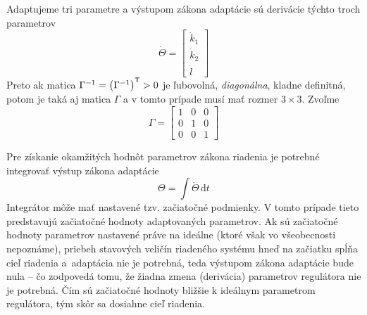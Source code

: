 \documentclass[a4paper, 10pt, ]{article}
\begin{document}
Adaptujeme tri parametre a výstupom zákona adaptácie sú derivácie týchto troch parametrov
\begin{equation}
	\dot \Theta = \begin{bmatrix} \dot{k}_1 \\ \dot{k}_2 \\ \dot{l} \end{bmatrix}
\end{equation}
Preto ak matica $\Gamma^{-1} = \left( \Gamma^{-1} \right)^{\mathsf{T}} > 0$ je ľubovolná, \emph{diagonálna}, kladne definitná, potom je taká aj matica $\Gamma$ a v tomto prípade musí mať rozmer $3\times3$. Zvoľme
\begin{equation}
	\Gamma =
    \begin{bmatrix}
		1 & 0 & 0 \\
		0 & 1 & 0 \\
		0 & 0 & 1
	\end{bmatrix}
\end{equation}



Pre získanie okamžitých hodnôt parametrov zákona riadenia je potrebné integrovať výstup zákona adaptácie
\begin{equation}
	\Theta = \int \dot \Theta \, \textrm{d}t
\end{equation}
Integrátor môže mať nastavené tzv. začiatočné podmienky. V tomto prípade tieto predstavujú začiatočné hodnoty adaptovaných parametrov. Ak sú začiatočné hodnoty parametrov nastavené práve na ideálne (ktoré však vo všeobecnosti nepoznáme), priebeh stavových veličín riadeného systému hneď na začiatku spĺňa cieľ riadenia a~adaptácia nie je potrebná, teda výstupom zákona adaptácie bude nula -- čo zodpovedá tomu, že žiadna zmena (derivácia) parametrov regulátora nie je potrebná. Čím sú začiatočné hodnoty bližšie k ideálnym parametrom regulátora, tým skôr sa dosiahne cieľ riadenia.
\end{document}
